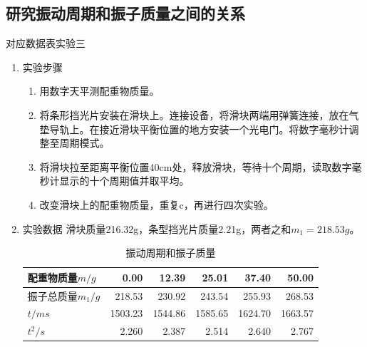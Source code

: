 \documentclass[11pt]{article}
\begin{document}
\subsection{研究振动周期和振子质量之间的关系}
对应数据表实验三
\begin{enumerate}
    \item 实验步骤
    \begin{enumerate}
        \item 用数字天平测配重物质量。
        \item 将条形挡光片安装在滑块上。连接设备，将滑块两端用弹簧连接，放在气垫导轨上。在接近滑块平衡位置的地方安装一个光电门。将数字毫秒计调整至周期模式。
        \item 将滑块拉至距离平衡位置40cm处，释放滑块，等待十个周期，读取数字毫秒计显示的十个周期值并取平均。
        \item 改变滑块上的配重物质量，重复c，再进行四次实验。
    \end{enumerate}
    \item 实验数据
    \newline 滑块质量216.32g，条型挡光片质量2.21g，两者之和$m_{1}=218.53g$。
        \begin{table}[H]
          \centering
          \caption{振动周期和振子质量}
            \begin{tabular}{|l|r|r|r|r|r|}\hline
            
                配重物质量$m/g$    & 0.00   & 12.39  & 25.01  & 37.40  & 50.00  \\\hline
                振子总质量$m_{1}/g$ & 218.53  & 230.92  & 243.54  & 255.93  & 268.53  \\\hline
                $t/ms$   & 1503.23  & 1544.86  & 1585.65  & 1624.70  & 1663.57  \\\hline
                $t^{2}/s$ & 2.260  & 2.387  & 2.514  & 2.640  & 2.767  \\\hline
    

\end{tabular}
\end{table}
\end{enumerate}
\end{document}
